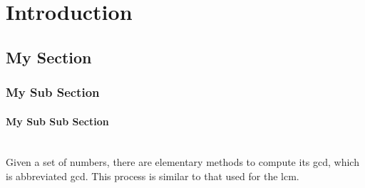 \chapter{Introduction}
\blindtext
\par
\blindtext

\section{My Section}
\blindtext

\subsection{My Sub Section}
\blindtext

\subsubsection{My Sub Sub Section}
\blindtext
\\
Given a set of numbers, there are elementary methods to compute its \acrlong{gcd}, which is abbreviated \acrshort{gcd}. This process is similar to that used for the \acrfull{lcm}.

